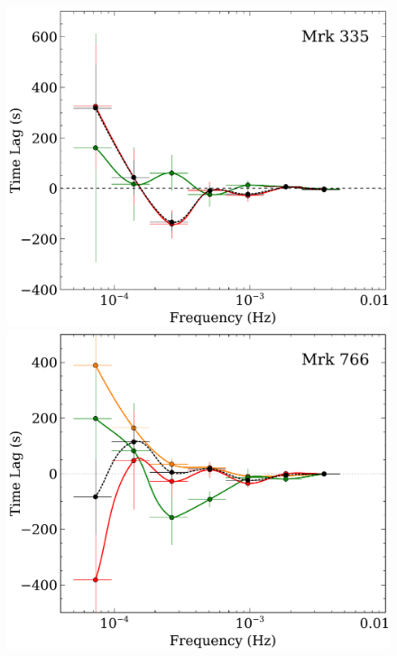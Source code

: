 \documentclass{article}
\begin{document}
\begin{figure}
\includegraphics[scale=0.4]{images/Mrk335-lag-results-lo-hi-flux-FP.pdf}
\includegraphics[scale=0.4]{images/Mrk766-lag-results-lo-hi-flux-FP.pdf}\\
\vspace{0.5cm}

\end{figure}
\end{document}
